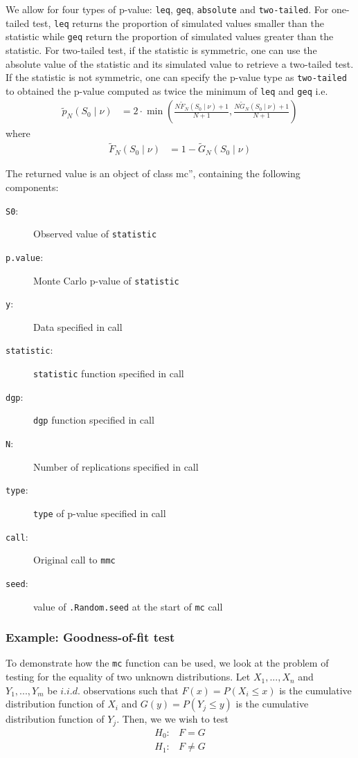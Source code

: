 \documentclass[11pt]{article}\usepackage[]{graphicx}\usepackage[]{color}
\let\code=\texttt
\begin{document}
	We allow for four types of p-value: \code{leq}, \code{geq}, \code{absolute} and
	\code{two-tailed}. For one-tailed test, \code{leq} returns the proportion of simulated values smaller than the statistic while \code{geq} return the proportion of simulated values greater than the statistic. For two-tailed test, if the statistic is symmetric, one can use the	absolute value of the statistic and its simulated value to retrieve a two-tailed test. If the statistic is not symmetric, one can specify the p-value type as \code{two-tailed} to obtained the p-value computed as twice the minimum of \code{leq} and \code{geq} i.e.
	\begin{align}
	\tilde{p}_{N}(S_{0} \mid \nu) & = 2 \cdot \min \left(  \frac{N\tilde{F}_{N}(S_{0} \mid \nu)+1}{N+1},
	\frac{N\tilde{G}_{N}(S_{0} \mid \nu)+1}{N+1}
	\right)
	\end{align}
	where
	\begin{align}
	\tilde{F}_{N}(S_{0} \mid \nu) & = 1-\tilde{G}_{N}(S_{0} \mid \nu)
	\end{align}

	The returned value is an object of class mc'', containing the following components:
	\begin{description}
		\item[\code{S0}:] Observed value of \code{statistic}
		\item[\code{p.value}:] Monte Carlo p-value of \code{statistic}
		\item[\code{y}:] Data specified in call
		\item[\code{statistic}:] \code{statistic} function specified in call
		\item[\code{dgp}:] \code{dgp} function specified in call
		\item[\code{N}:] Number of replications specified in call
		\item[\code{type}:] \code{type} of p-value specified in call
		\item[\code{call}:] Original call to \code{mmc}
		\item[\code{seed}:] value of \code{.Random.seed} at the start of \code{mc} call
	\end{description}

	\subsubsection{Example: Goodness-of-fit test}

	To demonstrate how the \code{mc} function can be used, we look at the problem of testing for the equality of two unknown distributions. Let $X_1,...,X_n$  and  $Y_1,...,Y_m$ be $i.i.d.$ observations such that  $F(x)=P(X_i \leq x)$ is the cumulative distribution function of $X_i$ and $G(y)=P(Y_j \leq y)$ is the cumulative distribution function of $Y_j$. Then, we we wish to test
	\begin{align}
		H_0: & F = G \\
		H_1: & F \neq G
	\end{align}
\end{document}
